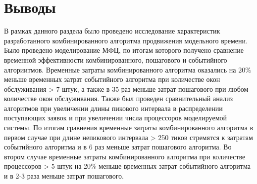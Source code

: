 \section{Выводы}
В рамках данного раздела было проведено исследование характеристик разработанного комбинированного алгоритма продвижения модельного времени. 
Было проведено моделирование МФЦ, по итогам которого получено сравнение временной эффективности комбинированного, пошагового и событийного алгориитмов. Временные затраты комбинированного алгоритма оказались на 20\% меньше временных затрат событийного алгоритма при количестве окон обслуживания > 7 штук, а также в 35 раз меньше затрат пошагового при любом количестве окон обслуживания. Также был проведен сравнительный анализ алгоритмов при увеличении длины пикового интервала в распределении поступающих заявок и при увеличении числа процессоров моделируемой системы. По итогам сравнения временные затраты комбинированного алгоритма в первом случае при длине непикового интервала > 250 тиков стремятся к затратам событийного алгоритма и в 6 раз меньше затрат пошагового алгоритма. Во втором случае временные затраты комбинированного алгоритма при количестве процессоров > 5 штук на 20\% меньше временных затрат событийного алгоритма и в 2-3 раза меньше затрат пошагового.